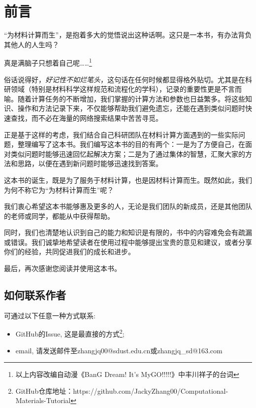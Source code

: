 \chapter{前言}

“为材料计算而生”，是抱着多大的觉悟说出这种话啊。这只是一本书，有办法背负其他人的人生吗？

\begin{center}
真是满脑子只想着自己呢……\footnote{以上内容改编自动漫《BanG Dream! It's MyGO!!!!!》中丰川祥子的台词}
\end{center}

俗话说得好，\textit{好记性不如烂笔头}，这句话在任何时候都显得格外贴切。尤其是在科研领域（特别是材料科学这样规范和流程化的学科），记录的重要性更是不言而喻。随着计算任务的不断增加，我们掌握的计算方法和参数也日益繁多。将这些知识、操作和方法记录下来，不仅能够帮助我们避免遗忘，还能在遇到类似问题时快速查找，而不必在海量的网络搜索结果中苦苦寻觅。

正是基于这样的考虑，我们结合自己科研团队在材料计算方面遇到的一些实际问题，整理编写了这本书。我们编写这本书的目的有两个：一是为了方便自己，在面对类似问题时能够迅速回忆起解决方案；二是为了通过集体的智慧，汇聚大家的方法和思路，以便在遇到新问题时能够迅速找到答案。

这本书的诞生，既是为了服务于材料计算，也是因材料计算而生。既然如此，我们为何不称它为“为材料计算而生”呢？

我们衷心希望这本书能够惠及更多的人，无论是我们团队的新成员，还是其他团队的老师或同学，都能从中获得帮助。

同时，我们也清楚地认识到自己的能力和知识是有限的，书中的内容难免会有疏漏或错误。我们诚挚地希望读者在使用过程中能够提出宝贵的意见和建议，或者分享你们的经验，共同促进我们的成长和进步。

最后，再次感谢您阅读并使用这本书。

\newpage

\section*{如何联系作者}
可通过以下任意一种方式联系:
\begin{itemize}
    \item GitHub的Issue, 这是最直接的方式\footnote{GitHub仓库地址：https://github.com/JackyZhang00/Computational-Materials-Tutorial};
    \item email, 请发送邮件至zhangjq00@sdust.edu.cn或zhangjq\_sd@163.com
\end{itemize}

